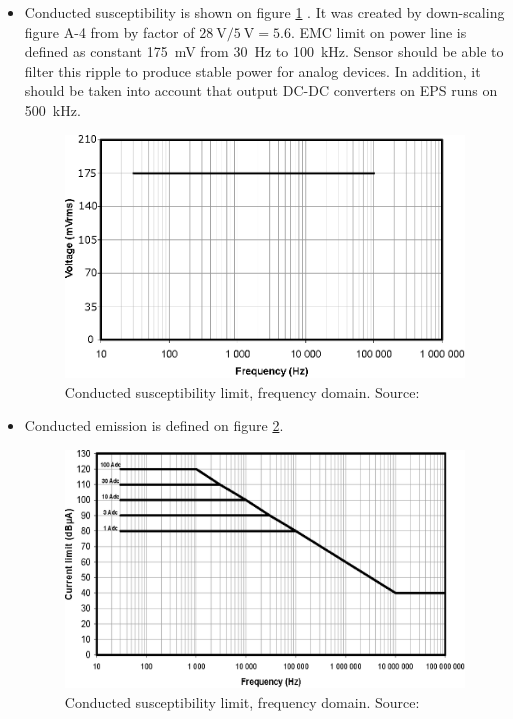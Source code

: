         \begin{itemize}
            \item Conducted susceptibility is shown on figure \ref{EMC_conducted_susceptibility} . It was created by down-scaling figure A-4 from \cite{ECSS_E_ST_20_07C} by factor of $\SI{28}{\volt}/\SI{5}{\volt} = 5.6$. EMC limit on power line is defined as constant \SI{175}{\milli\volt} from \SI{30}{\hertz} to \SI{100}{\kilo\hertz}. Sensor should be able to filter this ripple to produce stable power for analog devices. In addition, it should be taken into account that output DC-DC converters on EPS runs on \SI{500}{\kilo\hertz}.

            \begin{figure}[H]
                \centering
                \includegraphics[width=0.5\paperwidth]{img/EMC_conducted_susceptibility.eps}
                \caption{Conducted susceptibility limit, frequency domain. Source: \cite{ECSS_E_ST_20_07C}}
                \label{EMC_conducted_susceptibility}
            \end{figure}


            \item Conducted emission is defined on figure \ref{EMC_conducted_emission}.

            \begin{figure}[H]
                \centering
                \includegraphics[width=0.5\paperwidth]{img/EMC_conducted_emission.eps}
                \caption{Conducted susceptibility limit, frequency domain. Source: \cite{ECSS_E_ST_20_07C}}
                \label{EMC_conducted_emission}
            \end{figure}



\end{itemize}
